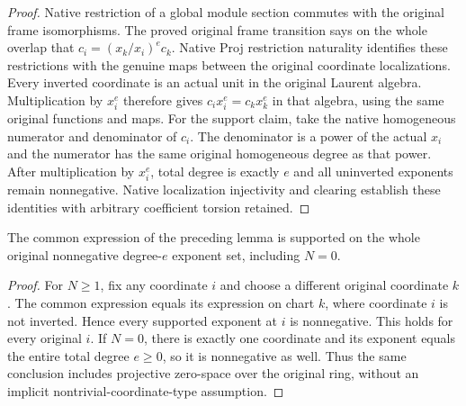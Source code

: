 \begin{proof}
Native restriction of a global module section commutes with the original
frame isomorphisms. The proved original frame transition says on the
whole overlap that $c_i=(x_k/x_i)^e c_k$. Native Proj restriction
naturality identifies these restrictions with the genuine maps between
the original coordinate localizations. Every inverted coordinate is an
actual unit in the original Laurent algebra. Multiplication by $x_i^e$
therefore gives $c_i x_i^e=c_k x_k^e$ in that algebra, using the same
original functions and maps. For the support claim, take the native
homogeneous numerator and denominator of $c_i$. The denominator is a
power of the actual $x_i$ and the numerator has the same original
homogeneous degree as that power. After multiplication by $x_i^e$,
total degree is exactly $e$ and all uninverted exponents remain
nonnegative. Native localization injectivity and clearing establish
these identities with arbitrary coefficient torsion retained.
\end{proof}

\begin{lemma}
\label{lem:c0n-ambient-compatible-nonnegative}
\leanok
{}
The common expression of the preceding lemma is supported on the whole
original nonnegative degree-$e$ exponent set, including $N=0$.
\end{lemma}
\begin{proof}
For $N\geq1$, fix any coordinate $i$ and choose a different original
coordinate $k$. The common expression equals its expression on chart
$k$, where coordinate $i$ is not inverted. Hence every supported
exponent at $i$ is nonnegative. This holds for every original $i$.
If $N=0$, there is exactly one coordinate and its exponent equals the
entire total degree $e\geq0$, so it is nonnegative as well. Thus the
same conclusion includes projective zero-space over the original ring,
without an implicit nontrivial-coordinate-type assumption.
\end{proof}

